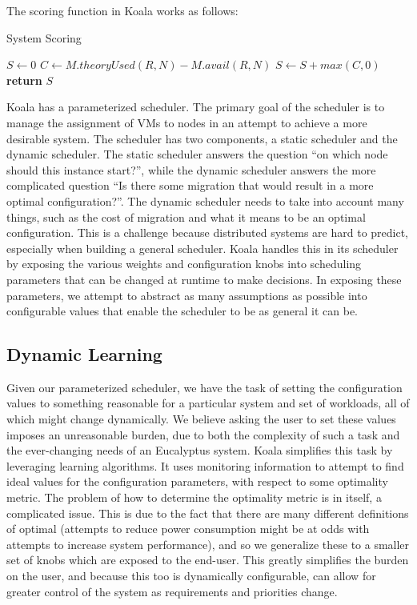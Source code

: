 The scoring function in Koala works as follows:

\begin{algorithm}
\caption{System Scoring}
\label{algo:score}
\footnotesize
\begin{algorithmic}
    \State $S \gets 0$
        \State $C \gets M.theoryUsed(R,N) - M.avail(R,N)$
        \State $S \gets S + max(C,0)$
    \EndFor
    \State \textbf{return} $S$
\EndProcedure
\end{algorithmic}
\normalsize
\end{algorithm}

Koala has a parameterized scheduler.  The primary goal of the scheduler is to
manage the assignment of VMs to nodes in an attempt to achieve a more desirable
system.  The scheduler has two components, a static scheduler and the dynamic
scheduler.  The static scheduler answers the question ``on which node should
this instance start?'', while the dynamic scheduler answers the more
complicated question ``Is there some migration that would result in a more
optimal configuration?''.  The dynamic scheduler needs to take into account
many things, such as the cost of migration and what it means to be an optimal
configuration.  This is a challenge because distributed systems are hard to
predict, especially when building a general scheduler.  Koala handles this in
its scheduler by exposing the various weights and configuration knobs into
scheduling parameters that can be changed at runtime to make decisions.  In
exposing these parameters, we attempt to abstract as many assumptions as
possible into configurable values that enable the scheduler to be as general it
can be.

\subsection{Dynamic Learning}
Given our parameterized scheduler, we have the task of setting the
configuration values to something reasonable for a particular system and set of
workloads, all of which might change dynamically.  We believe asking the user
to set these values imposes an unreasonable burden, due to both the complexity
of such a task and the ever-changing needs of an Eucalyptus system.  Koala
simplifies this task by leveraging learning algorithms.  It uses monitoring
information to attempt to find ideal values for the configuration parameters,
with respect to some optimality metric.  The problem of how to determine the
optimality metric is in itself, a complicated issue.  This is due to the fact
that there are many different definitions of optimal (attempts to reduce power
consumption might be at odds with attempts to increase system performance), and
so we generalize these to a smaller set of knobs which are exposed to the
end-user.  This greatly simplifies the burden on the user, and because this too
is dynamically configurable, can allow for greater control of the system as
requirements and priorities change.


